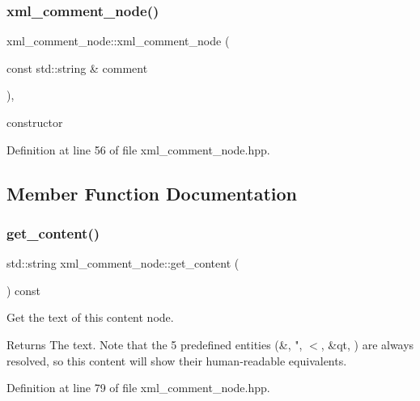 \subsubsection{\texorpdfstring{xml\+\_\+comment\+\_\+node()}{xml\_comment\_node()}}
{\footnotesize\ttfamily xml\+\_\+comment\+\_\+node\+::xml\+\_\+comment\+\_\+node (\begin{DoxyParamCaption}\item[{const std\+::string \&}]{comment }\end{DoxyParamCaption})\hspace{0.3cm}{\ttfamily [inline]}, {\ttfamily [explicit]}}



constructor 



Definition at line 56 of file xml\+\_\+comment\+\_\+node.\+hpp.



\subsection{Member Function Documentation}
\mbox{\label{classxml__comment__node_ae1f14567e56f0c3d70e1b7d05765093a}} 
\subsubsection{\texorpdfstring{get\+\_\+content()}{get\_content()}}
{\footnotesize\ttfamily std\+::string xml\+\_\+comment\+\_\+node\+::get\+\_\+content (\begin{DoxyParamCaption}{ }\end{DoxyParamCaption}) const\hspace{0.3cm}{\ttfamily [inline]}}



Get the text of this content node. 

\begin{DoxyReturn}{Returns}
The text. Note that the 5 predefined entities (\&, ", $<$, \&qt, \textquotesingle{}) are always resolved, so this content will show their human-\/readable equivalents. 
\end{DoxyReturn}


Definition at line 79 of file xml\+\_\+comment\+\_\+node.\+hpp.



